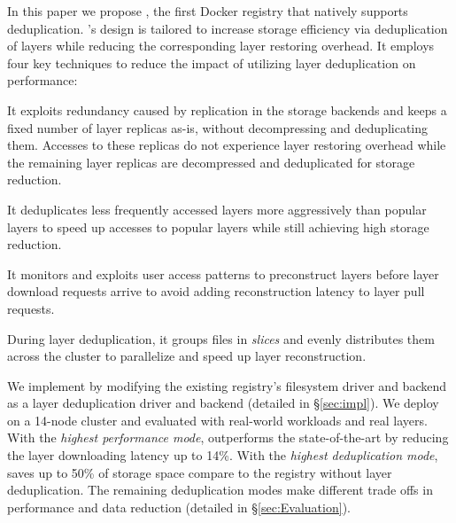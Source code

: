 In this paper we propose \sysname, the first Docker registry that natively
supports deduplication.
%
\sysname's design is tailored to
increase storage efficiency via deduplication of layers while
reducing the corresponding layer restoring overhead. 
 
It employs four key techniques to reduce
the impact of utilizing layer deduplication on performance: 
%
%
\begin{compactenumerate}
\item It exploits redundancy caused by replication in the storage backends and keeps a fixed
number of layer replicas as-is, without decompressing and deduplicating them.
%
Accesses to these replicas do not experience layer restoring overhead while
the remaining layer replicas are decompressed
and deduplicated for storage reduction.
%
\item It deduplicates less frequently accessed layers more
aggressively than popular layers to speed up accesses to popular
layers while still achieving high storage reduction.
%
\item It monitors and exploits user access patterns to preconstruct
layers before layer download requests arrive to avoid adding reconstruction
latency to layer pull requests.
%
\item During layer deduplication, it groups files in \emph{slices} and evenly
distributes them across the cluster to parallelize and speed up layer reconstruction.
%
\end{compactenumerate}



We implement \sysname by modifying the existing registry's filesystem driver and backend as a 
layer deduplication driver and backend (detailed in \S\ref{sec:impl}).
We deploy \sysname
on a 14-node cluster and evaluated with real-world workloads and real layers.
With the \emph{highest performance mode},
\sysname outperforms the state-of-the-art by reducing the layer downloading latency up to 14\%.
With the \emph{highest deduplication mode},
\sysname saves up to 50\% of storage space compare to the registry without layer deduplication.
The remaining deduplication modes make different trade offs in performance and data reduction (detailed in \S\ref{sec:Evaluation}).
%
